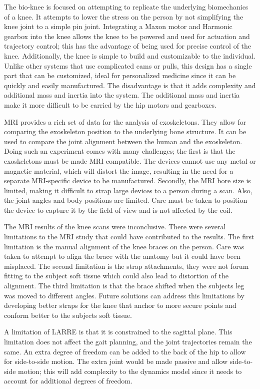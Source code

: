 The bio-knee is focused on attempting to replicate the underlying biomechanics of a knee. It attempts to lower the stress on the person by not simplifying the knee joint to a simple pin joint. Integrating a Maxon motor and Harmonic gearbox into the knee allows the knee to be powered and used for actuation and trajectory control; this has the advantage of being used for precise control of the knee. Additionally, the knee is simple to build and customizable to the individual. Unlike other systems that use complicated cams or pulls, this design has a single part that can be customized, ideal for personalized medicine since it can be quickly and easily manufactured. The disadvantage is that it adds complexity and additional mass and inertia into the system. The additional mass and inertia make it more difficult to be carried by the hip motors and gearboxes.

MRI provides a rich set of data for the analysis of exoskeletons. They allow for comparing the exoskeleton position to the underlying bone structure. It can be used to compare the joint alignment between the human and the exoskeleton. Doing such an experiment comes with many challenges; the first is that the exoskeletons must be made MRI compatible. The devices cannot use any metal or magnetic material, which will distort the image, resulting in the need for a separate MRI-specific device to be manufactured. Secondly, the MRI bore size is limited, making it difficult to strap large devices to a person during a scan. Also, the joint angles and body positions are limited. Care must be taken to position the device to capture it by the field of view and is not affected by the coil. 

The MRI results of the knee scans were inconclusive. There were several limitations to the MRI study that could have contributed to the results. The first limitation is the manual alignment of the knee braces on the person. Care was taken to attempt to align the brace with the anatomy but it could have been misplaced. The second limitation is the strap attachments, they were not forum fitting to the subject soft tissue which could also lead to distortion of the alignment. The third limitation is that the brace shifted when the subjects leg was moved to different angles. Future solutions can address this limitations by developing better straps for the knee that anchor to more secure points and conform better to the subjects soft tissue. 

A limitation of LARRE is that it is constrained to the sagittal plane. This limitation does not affect the gait planning, and the joint trajectories remain the same. An extra degree of freedom can be added to the back of the hip to allow for side-to-side motion. The extra joint would be made passive and allow side-to-side motion; this will add complexity to the dynamics model since it needs to account for additional degrees of freedom.  

